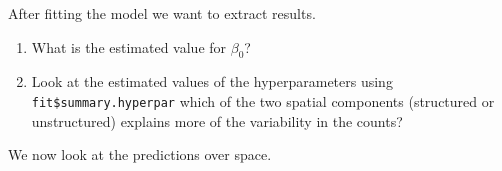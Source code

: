 \documentclass[
  letterpaper,
  DIV=11,
  numbers=noendperiod]{scrartcl}
\begin{document}
After fitting the model we want to extract results.

\begin{tcolorbox}[enhanced jigsaw, title={Question}, bottomtitle=1mm, arc=.35mm, titlerule=0mm, opacityback=0, rightrule=.15mm, breakable, colback=white, colbacktitle=quarto-callout-tip-color!10!white, bottomrule=.15mm, coltitle=black, left=2mm, colframe=quarto-callout-tip-color-frame, toptitle=1mm, toprule=.15mm, opacitybacktitle=0.6, leftrule=.75mm]

\begin{enumerate}
\def\labelenumi{\arabic{enumi}.}
\item
  What is the estimated value for \(\beta_0\)?
\item
  Look at the estimated values of the hyperparameters using
  \texttt{fit\$summary.hyperpar} which of the two spatial components
  (structured or unstructured) explains more of the variability in the
  counts?
\end{enumerate}

\end{tcolorbox}

We now look at the predictions over space.
\end{document}
